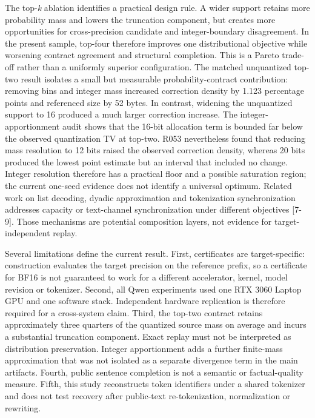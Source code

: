 \documentclass{nature}
\begin{document}
The top-\textit{k} ablation identifies a practical design rule. A wider support retains more probability mass and lowers the truncation component, but creates more opportunities for cross-precision candidate and integer-boundary disagreement. In the present sample, top-four therefore improves one distributional objective while worsening contract agreement and structural completion. This is a Pareto trade-off rather than a uniformly superior configuration. The matched unquantized top-two result isolates a small but measurable probability-contract contribution: removing bins and integer mass increased correction density by 1.123 percentage points and referenced size by 52 bytes. In contrast, widening the unquantized support to 16 produced a much larger correction increase. The integer-apportionment audit shows that the 16-bit allocation term is bounded far below the observed quantization TV at top-two. R053 nevertheless found that reducing mass resolution to 12 bits raised the observed correction density, whereas 20 bits produced the lowest point estimate but an interval that included no change. Integer resolution therefore has a practical floor and a possible saturation region; the current one-seed evidence does not identify a universal optimum. Related work on list decoding, dyadic approximation and tokenization synchronization addresses capacity or text-channel synchronization under different objectives [7-9]. Those mechanisms are potential composition layers, not evidence for target-independent replay.

Several limitations define the current result. First, certificates are target-specific: construction evaluates the target precision on the reference prefix, so a certificate for BF16 is not guaranteed to work for a different accelerator, kernel, model revision or tokenizer. Second, all Qwen experiments used one RTX 3060 Laptop GPU and one software stack. Independent hardware replication is therefore required for a cross-system claim. Third, the top-two contract retains approximately three quarters of the quantized source mass on average and incurs a substantial truncation component. Exact replay must not be interpreted as distribution preservation. Integer apportionment adds a further finite-mass approximation that was not isolated as a separate divergence term in the main artifacts. Fourth, public sentence completion is not a semantic or factual-quality measure. Fifth, this study reconstructs token identifiers under a shared tokenizer and does not test recovery after public-text re-tokenization, normalization or rewriting.
\end{document}

